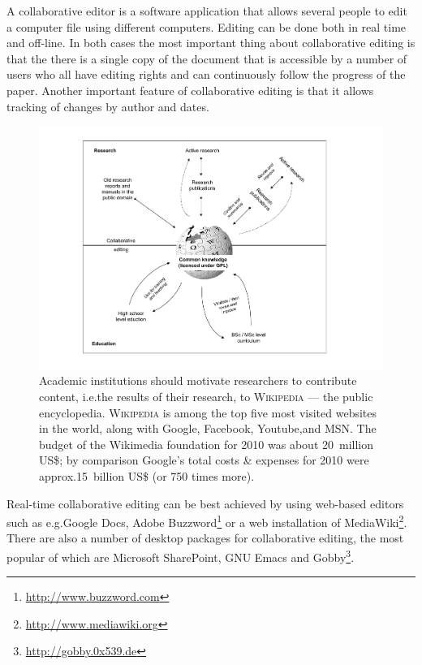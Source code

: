 \documentclass[graybox,envcountchap,sectrefs,UStrade]{svmono}
\begin{document}
A collaborative editor is a software application that allows several people to edit a computer file using different computers. Editing can be done both in real time and off-line. In both cases the most important thing about collaborative editing is that the there is a single copy of the document that is accessible by a number of users who all have editing rights and can continuously follow the progress of the paper. Another important feature of collaborative editing is that it allows tracking of changes by author and dates.\par

\begin{figure}[!htb]
\begin{center}
  \includegraphics[width=.95\textwidth]{Fig_from_active_research_to_wikipedia.pdf}
\caption{Academic institutions should motivate researchers to contribute content, i.e.\@ the results of their research, to \textsc{Wikipedia} --- the public encyclopedia. \textsc{Wikipedia} is among the top five most visited websites in the world, along with Google, Facebook, Youtube,and MSN. The budget of the Wikimedia foundation for 2010 was about 20~million US\$; by comparison Google's total costs \& expenses for 2010 were approx.\@ 15~billion US\$ (or 750 times more).} \label{Fig:From_active_research_to_Wikipedia}
\end{center}
\end{figure}


Real-time collaborative editing can be best achieved by using web-based editors such as e.g.\@ \textsf{Google Docs}, \textsf{Adobe Buzzword}\footnote{\url{http://www.buzzword.com}} or a web installation of \textsf{MediaWiki}\footnote{\url{http://www.mediawiki.org}}. There are also a number of desktop packages for collaborative editing, the most popular of which are Microsoft \textsf{SharePoint}, \textsf{GNU Emacs} and \textsf{Gobby}\footnote{\url{http://gobby.0x539.de}}.\par
\end{document}
